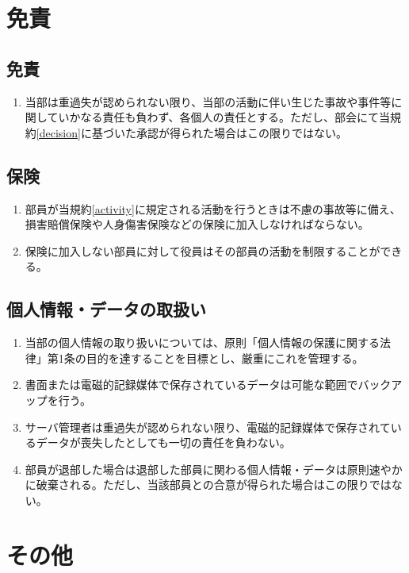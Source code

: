\documentclass[12pt, unicode, a4paper]{ltjsreport}
\begin{document}
\chapter{免責}
    \section{免責}
        \begin{enumerate}
            \item 当部は重過失が認められない限り、当部の活動に伴い生じた事故や事件等に関していかなる責任も負わず、各個人の責任とする。ただし、部会にて当規約\ref{decision}に基づいた承認が得られた場合はこの限りではない。
        \end{enumerate}
    \section{保険}
        \begin{enumerate}
            \item 部員が当規約\ref{activity}に規定される活動を行うときは不慮の事故等に備え、損害賠償保険や人身傷害保険などの保険に加入しなければならない。
            \item 保険に加入しない部員に対して役員はその部員の活動を制限することができる。
        \end{enumerate}

    \section{個人情報・データの取扱い}
        \begin{enumerate}
            \item 当部の個人情報の取り扱いについては、原則「個人情報の保護に関する法律」第1条の目的を達することを目標とし、厳重にこれを管理する。
            \item 書面または電磁的記録媒体で保存されているデータは可能な範囲でバックアップを行う。
            \item サーバ管理者は重過失が認められない限り、電磁的記録媒体で保存されているデータが喪失したとしても一切の責任を負わない。
            \item 部員が退部した場合は退部した部員に関わる個人情報・データは原則速やかに破棄される。ただし、当該部員との合意が得られた場合はこの限りではない。
        \end{enumerate}


\chapter{その他}
\end{document}
